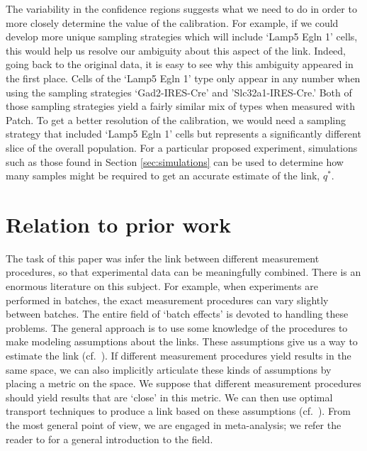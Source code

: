 The variability in the confidence regions suggests what we need to do in order to more closely determine the value of the calibration.  For example, if we could develop more unique sampling strategies which will include `Lamp5 Egln 1' cells, this would help us resolve our ambiguity about this aspect of the link.  Indeed, going back to the original data, it is easy to see why this ambiguity appeared in the first place.  Cells of the `Lamp5 Egln 1' type only appear in any number when using the sampling strategies `Gad2-IRES-Cre' and 'Slc32a1-IRES-Cre.'  Both of those sampling strategies yield a fairly similar mix of types when measured with Patch.  To get a better resolution of the calibration, we would need a sampling strategy that included `Lamp5 Egln 1' cells but represents a significantly different slice of the overall population.  For a particular proposed experiment, simulations such as those found in Section \ref{sec:simulations} can be used to determine how many samples might be required to get an accurate estimate of the link, $q^*$.



\section{Relation to prior work}

The task of this paper was infer the link between different measurement procedures, so that experimental data can be meaningfully combined.  There is an enormous literature on this subject.  For example, when experiments are performed in batches, the exact measurement procedures can vary slightly between batches.  The entire field of `batch effects' is devoted to handling these problems.  The general approach is to use some knowledge of the procedures to make modeling assumptions about the links.  These assumptions give us a way to estimate the link (cf.\ \cite{johnson2007adjusting}).  If different measurement procedures yield results in the same space, we can also implicitly articulate these kinds of assumptions by placing a metric on the space.  We suppose that different measurement procedures should yield results that are `close' in this metric.  We can then use optimal transport techniques to produce a link based on these assumptions (cf.\ \cite{tabak2018explanation}).  From the most general point of view, we are engaged in meta-analysis; we refer the reader to \cite{borenstein2011introduction} for a general introduction to the field.  

